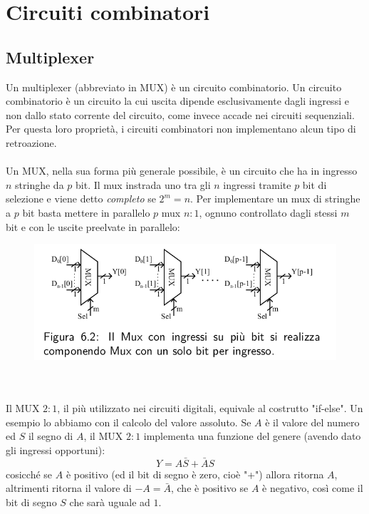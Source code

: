 \documentclass{book}
\begin{document}
\chapter{Circuiti combinatori}
    \section{Multiplexer}
        Un multiplexer (abbreviato in MUX) è un circuito combinatorio. Un circuito combinatorio è un circuito la cui uscita dipende esclusivamente dagli ingressi e non dallo stato corrente del circuito, come invece accade nei circuiti sequenziali. Per questa loro proprietà, i circuiti combinatori non implementano alcun tipo di retroazione. \\ \\
        Un MUX, nella sua forma più generale possibile, è un circuito che ha in ingresso $n$ stringhe da $p$ bit. Il mux instrada uno tra gli $n$ ingressi tramite $p$ bit di selezione e viene detto \textit{completo} se $2^{m} = n$. Per implementare un mux di stringhe a $p$ bit basta mettere in parallelo $p$ mux $n:1$, ognuno controllato dagli stessi $m$ bit e con le uscite preelvate in parallelo:
        \begin{figure}[h!]
            \centering
            \includegraphics[width=0.75\linewidth]{img/chap6img1.png}
        \end{figure} \\ \\
        Il MUX  $2:1$, il più utilizzato nei circuiti digitali, equivale al costrutto "if-else". Un esempio lo abbiamo con il calcolo del valore assoluto. Se $A$ è il valore del numero ed $S$ il segno di $A$, il MUX $2:1$ implementa una funzione del genere (avendo dato gli ingressi opportuni):
        \begin{equation}
            Y = A\bar{S}+\bar{A}S
        \end{equation}
        cosicché se $A$ è positivo (ed il bit di segno è zero, cioè "+") allora ritorna $A$, altrimenti ritorna il valore di $-A = \bar{A}$, che è positivo se $A$ è negativo, così come il bit di segno $S$ che sarà uguale ad $1$.
\end{document}
